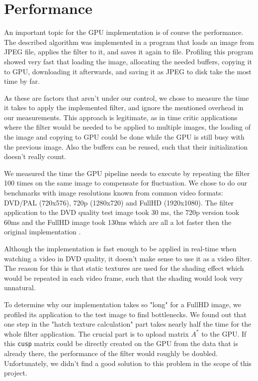 \section{Performance} \label{performance}
An important topic for the GPU implementation is of course the performance.
The described algorithm was implemented in a program that loads an image
from JPEG file, applies the filter to it, and saves it again to file.
Profiling this program showed very fast that loading the image, allocating the
needed buffers, copying it to GPU, downloading it afterwards, and saving it
as JPEG to disk take the most time by far.

As these are factors that aren't under our control, we chose to measure
the time it takes to apply the implemented filter, and ignore the mentioned
overhead in our measurements. This approach is legitimate, as in time critic
applications where the filter would be needed to be applied to multiple images,
the loading of the image and copying to GPU could be done while the GPU
is still busy with the previous image. Also the buffers can be reused,
such that their initialization doesn't really count.

We measured the time the GPU pipeline needs to execute by repeating the
filter 100 times on the same image to compensate for fluctuation. We chose to do
our benchmarks with image resolutions known from common video formats:
DVD/PAL (720x576), 720p (1280x720) and FullHD (1920x1080). The filter
application to the DVD quality test image took 30 ms, the 720p version
took 60ms and the FullHD image took 130ms which are all a lot faster
then the original implementation \cite{mainPaper}.

Although the implementation is fast enough to be applied in real-time when watching
a video in DVD quality, it doesn't make sense to use it as a video filter.
The reason for this is that static textures are used for the shading effect
which would be repeated in each video frame, such that the shading would look
very unnatural.

To determine why our implementation takes so "long" for a FullHD image,
we profiled its application to the test image to find bottlenecks. We found out
that one step in the "hatch texture calculation" part takes nearly half the
time for the whole filter application. The crucial part is to upload matrix
$A^*$ to the GPU. If this \texttt{cusp} matrix could be directly created on the
GPU from the data that is already there, the performance of the filter would
roughly be doubled.  Unfortunately, we didn't find a good solution to this problem
in the scope of this project.
